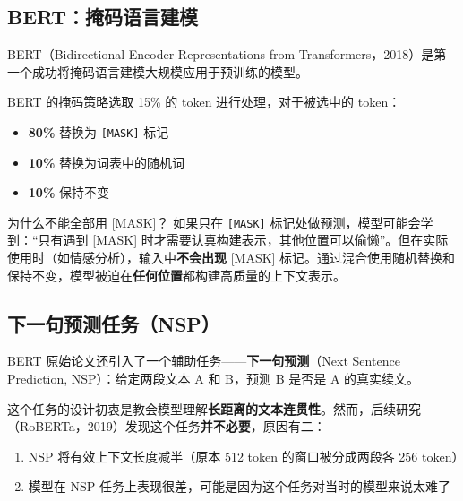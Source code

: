 \documentclass[a4paper]{article}
\begin{document}
\subsection{BERT：掩码语言建模}

BERT（Bidirectional Encoder Representations from Transformers，2018）是第一个成功将掩码语言建模大规模应用于预训练的模型。





BERT 的掩码策略选取 15\% 的 token 进行处理，对于被选中的 token：

\begin{itemize}
    \item \textbf{80\%} 替换为 \texttt{[MASK]} 标记
    \item \textbf{10\%} 替换为词表中的随机词
    \item \textbf{10\%} 保持不变
\end{itemize}

\begin{warningbox}{为什么不能全部用 [MASK]？}
如果只在 \texttt{[MASK]} 标记处做预测，模型可能会学到：``只有遇到 [MASK] 时才需要认真构建表示，其他位置可以偷懒''。但在实际使用时（如情感分析），输入中\textbf{不会出现} [MASK] 标记。通过混合使用随机替换和保持不变，模型被迫在\textbf{任何位置}都构建高质量的上下文表示。
\end{warningbox}




\subsection{下一句预测任务（NSP）}

BERT 原始论文还引入了一个辅助任务——\textbf{下一句预测}（Next Sentence Prediction, NSP）：给定两段文本 A 和 B，预测 B 是否是 A 的真实续文。

这个任务的设计初衷是教会模型理解\textbf{长距离的文本连贯性}。然而，后续研究（RoBERTa，2019）发现这个任务\textbf{并不必要}，原因有二：

\begin{enumerate}
    \item NSP 将有效上下文长度减半（原本 512 token 的窗口被分成两段各 256 token）
    \item 模型在 NSP 任务上表现很差，可能是因为这个任务对当时的模型来说太难了
\end{enumerate}
\end{document}
